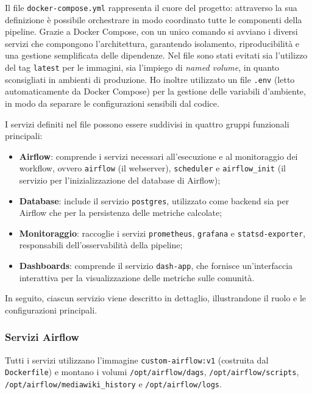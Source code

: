 Il file \texttt{docker-compose.yml} rappresenta il cuore del progetto: attraverso la sua definizione è possibile orchestrare in modo coordinato tutte le componenti della pipeline.  
Grazie a Docker Compose, con un unico comando si avviano i diversi servizi che compongono l’architettura, garantendo isolamento, riproducibilità e una gestione semplificata delle dipendenze.
Nel file sono stati evitati sia l’utilizzo del tag \texttt{latest} per le immagini, sia l’impiego di \emph{named volume}, in quanto sconsigliati in ambienti di produzione.%
Ho inoltre utilizzato un file \texttt{.env} (letto automaticamente da Docker Compose) per la gestione delle variabili d’ambiente, in modo da separare le configurazioni sensibili dal codice.

I servizi definiti nel file possono essere suddivisi in quattro gruppi funzionali principali:  

\begin{itemize}
    \item \textbf{Airflow}: comprende i servizi necessari all’esecuzione e al monitoraggio dei workflow, ovvero \texttt{airflow} (il webserver), \texttt{scheduler} e \texttt{airflow\_init} (il servizio per l’inizializzazione del database di Airflow);
    \item \textbf{Database}: include il servizio \texttt{postgres}, utilizzato come backend sia per Airflow che per la persistenza delle metriche calcolate;
    \item \textbf{Monitoraggio}: raccoglie i servizi \texttt{prometheus}, \texttt{grafana} e \texttt{statsd-exporter}, responsabili dell’osservabilità della pipeline;
    \item \textbf{Dashboards}: comprende il servizio \texttt{dash-app}, che fornisce un’interfaccia interattiva per la visualizzazione delle metriche sulle comunità.
\end{itemize}


In seguito, ciascun servizio viene descritto in dettaglio, illustrandone il ruolo e le configurazioni principali.
\subsubsection{Servizi Airflow}

Tutti i servizi utilizzano l’immagine \texttt{custom-airflow:v1} (costruita dal \texttt{Dockerfile}) e montano i volumi \texttt{/opt/airflow/dags}, \texttt{/opt/airflow/scripts}, \texttt{/opt/airflow/mediawiki\_history} e \texttt{/opt/airflow/logs}.

